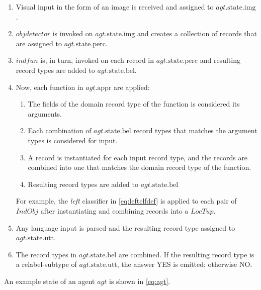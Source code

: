 \begin{enumerate}
\item Visual input in the form of an image is received and assigned to $agt.\text{state}.\text{img}$.
\item $objdetector$ is invoked on $agt.\text{state.img}$ and creates a collection of records that are assigned to $agt.\text{state}.\text{perc}$.
\item $indfun$ is, in turn, invoked on each record in $agt.\text{state.perc}$ and resulting record types are added to $agt.\text{state.bel}$.
\item Now, each function in $agt.\text{appr}$ are applied:
	\begin{enumerate}
	\item The fields of the domain record type of the function is considered its arguments.
	\item Each combination of $agt.\text{state.bel}$ record types that matches the argument types is considered for input.
	\item A record is instantiated for each input record type, and the records are combined into one that matches the domain record type of the function.
	\item Resulting record types are added to $agt.\text{state.bel}$
	\end{enumerate}
	For example, the \textit{left} classifier in \autoref{eq:leftclfdef} is applied to each pair of $IndObj$ after instantiating and combining records into a $LocTup$.
\item Any language input is parsed and the resulting record type assigned to $agt.\text{state.utt}$.
\item The record types in $agt.\text{state.bel}$ are combined. If the resulting record type is a relabel-subtype of $agt.\text{state.utt}$, the answer YES is emitted; otherwise NO.
\end{enumerate}

An example state of an agent $agt$ is shown in \autoref{eq:agt}.

